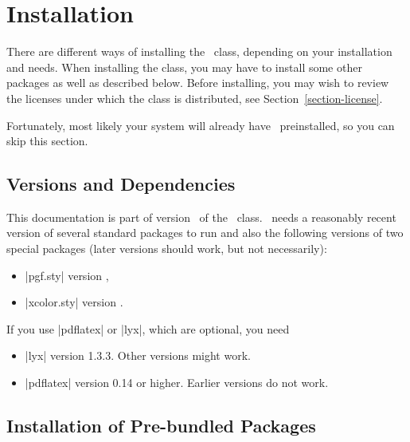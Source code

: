 %
%
%


\section{Installation}
\label{section-installation}

There are different ways of installing the \beamer\ class, depending on your installation and needs. When installing the class, you may have to install some other packages as well as described below. Before installing, you may wish to review the licenses under which the class is distributed, see Section~\ref{section-license}.

Fortunately, most likely your system will already have \beamer\ preinstalled, so you can skip this section.


\subsection{Versions and Dependencies}

This documentation is part of version \beamerugversion\ of the \beamer\ class. \beamer\ needs a reasonably recent version of several standard packages to run and also the following versions of two special packages (later versions should work, but not necessarily):
\begin{itemize}
\item
  |pgf.sty| version \beamerugpgfversion,
\item
  |xcolor.sty| version \beamerugxcolorversion.
\end{itemize}

If you use |pdflatex| or |lyx|, which are optional, you need
\begin{itemize}
\item
  |lyx| version 1.3.3. Other versions might work.
\item
  |pdflatex| version 0.14 or higher. Earlier versions do not work.
\end{itemize}


\subsection{Installation of Pre-bundled Packages}

